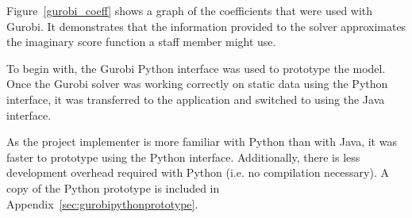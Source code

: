 Figure~\ref{gurobi_coeff} shows a graph of the coefficients that were used
with Gurobi. It demonstrates that the information provided to the solver
approximates the imaginary score function a staff member might use.

To begin with, the Gurobi Python interface was used to prototype the model.
Once the Gurobi solver was working correctly on static data using the Python
interface, it was transferred to the application and switched to using the
Java interface.

As the project implementer is more familiar with Python than with Java, it was
faster to prototype using the Python interface. Additionally, there is less
development overhead required with Python (i.e. no compilation necessary). A
copy of the Python prototype is included in
Appendix~\ref{sec:gurobipythonprototype}.
